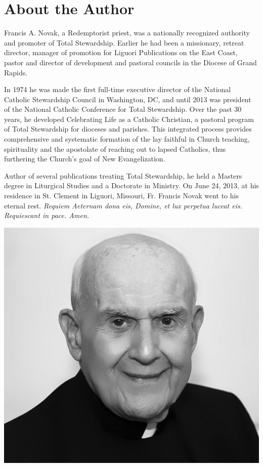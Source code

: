 \documentclass[oneside]{book}
\begin{document}

\chapter{About the Author}

Francis A. Novak, a Redemptorist priest, was a nationally recognized authority
and promoter of Total Stewardship. Earlier he had been a missionary, retreat
director, manager of promotion for Liguori Publications on the East Coast,
pastor and director of development and pastoral councils in the Diocese of Grand
Rapids.

In 1974 he was made the first full-time executive director of the National
Catholic Stewardship Council in Washington, DC, and until 2013 was president of
the National Catholic Conference for Total Stewardship. Over the past 30 years,
he developed Celebrating Life as a Catholic Christian, a pastoral program of
Total Stewardship for dioceses and parishes. This integrated process provides
comprehensive and systematic formation of the lay faithful in Church teaching,
spirituality and the apostolate of reaching out to lapsed Catholics, thus
furthering the Church's goal of New Evangelization.

Author of several publications treating Total Stewardship, he held a Masters
degree in Liturgical Studies and a Doctorate in Ministry. On June 24, 2013, at
his residence in St. Clement in Liguori, Missouri, Fr. Francis Novak went to his
eternal rest. \emph{Requiem Aeternam dona eis, Domine, et lux perpetua luceat
eis. Requiescant in pace. Amen.}

\begin{center}

\includegraphics[scale=0.21]{fr-novak}

\end{center}

\end{document}
